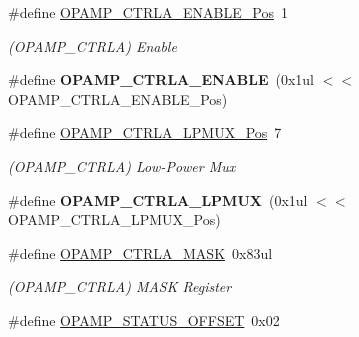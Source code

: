\begin{DoxyCompactItemize}
\item 
\hypertarget{group___s_a_m_l21___o_p_a_m_p_gae917b5dedcd7b6087f4400e5bc95c859}{}\#define \hyperlink{group___s_a_m_l21___o_p_a_m_p_gae917b5dedcd7b6087f4400e5bc95c859}{O\+P\+A\+M\+P\+\_\+\+C\+T\+R\+L\+A\+\_\+\+E\+N\+A\+B\+L\+E\+\_\+\+Pos}~1\label{group___s_a_m_l21___o_p_a_m_p_gae917b5dedcd7b6087f4400e5bc95c859}

\begin{DoxyCompactList}\small\item\em (O\+P\+A\+M\+P\+\_\+\+C\+T\+R\+L\+A) Enable \end{DoxyCompactList}\item 
\hypertarget{group___s_a_m_l21___o_p_a_m_p_ga42b652e546c0b3c3ee7a6834c24416bc}{}\#define {\bfseries O\+P\+A\+M\+P\+\_\+\+C\+T\+R\+L\+A\+\_\+\+E\+N\+A\+B\+L\+E}~(0x1ul $<$$<$ O\+P\+A\+M\+P\+\_\+\+C\+T\+R\+L\+A\+\_\+\+E\+N\+A\+B\+L\+E\+\_\+\+Pos)\label{group___s_a_m_l21___o_p_a_m_p_ga42b652e546c0b3c3ee7a6834c24416bc}

\item 
\hypertarget{group___s_a_m_l21___o_p_a_m_p_gab9b2f9601abf0368d1acab90f9a8be17}{}\#define \hyperlink{group___s_a_m_l21___o_p_a_m_p_gab9b2f9601abf0368d1acab90f9a8be17}{O\+P\+A\+M\+P\+\_\+\+C\+T\+R\+L\+A\+\_\+\+L\+P\+M\+U\+X\+\_\+\+Pos}~7\label{group___s_a_m_l21___o_p_a_m_p_gab9b2f9601abf0368d1acab90f9a8be17}

\begin{DoxyCompactList}\small\item\em (O\+P\+A\+M\+P\+\_\+\+C\+T\+R\+L\+A) Low-\/\+Power Mux \end{DoxyCompactList}\item 
\hypertarget{group___s_a_m_l21___o_p_a_m_p_ga8ac1b6ccbce774fc322100c6adb2a644}{}\#define {\bfseries O\+P\+A\+M\+P\+\_\+\+C\+T\+R\+L\+A\+\_\+\+L\+P\+M\+U\+X}~(0x1ul $<$$<$ O\+P\+A\+M\+P\+\_\+\+C\+T\+R\+L\+A\+\_\+\+L\+P\+M\+U\+X\+\_\+\+Pos)\label{group___s_a_m_l21___o_p_a_m_p_ga8ac1b6ccbce774fc322100c6adb2a644}

\item 
\hypertarget{group___s_a_m_l21___o_p_a_m_p_ga216c0cd5db5212e8f7835ac944a4c5f5}{}\#define \hyperlink{group___s_a_m_l21___o_p_a_m_p_ga216c0cd5db5212e8f7835ac944a4c5f5}{O\+P\+A\+M\+P\+\_\+\+C\+T\+R\+L\+A\+\_\+\+M\+A\+S\+K}~0x83ul\label{group___s_a_m_l21___o_p_a_m_p_ga216c0cd5db5212e8f7835ac944a4c5f5}

\begin{DoxyCompactList}\small\item\em (O\+P\+A\+M\+P\+\_\+\+C\+T\+R\+L\+A) M\+A\+S\+K Register \end{DoxyCompactList}\item 
\hypertarget{group___s_a_m_l21___o_p_a_m_p_ga766a7330ea94ca11f9cdbb9b253095a1}{}\#define \hyperlink{group___s_a_m_l21___o_p_a_m_p_ga766a7330ea94ca11f9cdbb9b253095a1}{O\+P\+A\+M\+P\+\_\+\+S\+T\+A\+T\+U\+S\+\_\+\+O\+F\+F\+S\+E\+T}~0x02\label{group___s_a_m_l21___o_p_a_m_p_ga766a7330ea94ca11f9cdbb9b253095a1}


\end{DoxyCompactItemize}
